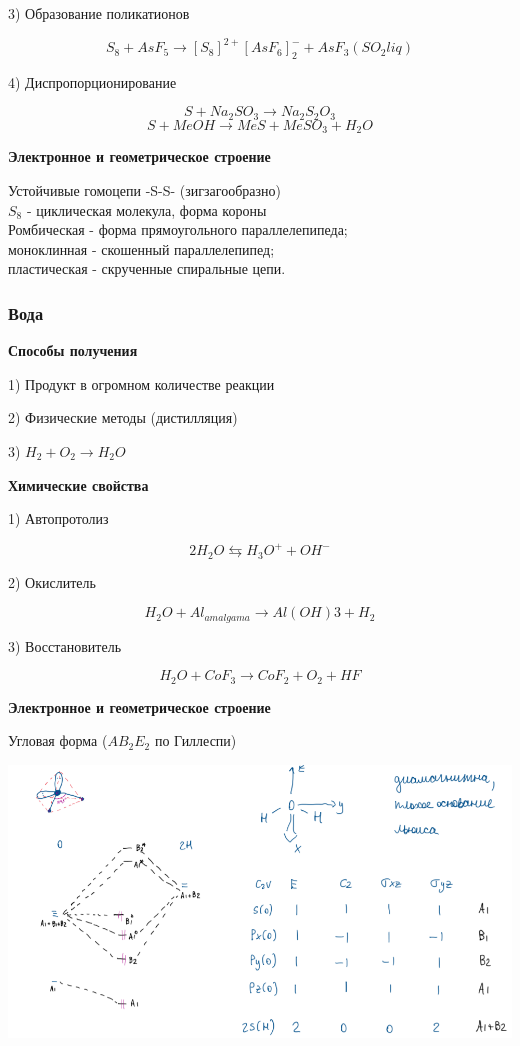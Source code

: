 \documentclass[14pt,a4paper]{scrartcl}
\begin{document}
3) Образование поликатионов

$$S_8 + AsF_5 \rightarrow [S_8]^{2+}[AsF_6]_2^- + AsF_3(SO_2 liq)$$

4) Диспропорционирование

$$S + Na_2SO_3 \rightarrow Na_2S_2O_3$$
$$S + MeOH \rightarrow MeS + MeSO_3 + H_2O$$

\textbf{Электронное и геометрическое строение}

Устойчивые гомоцепи -S-S- (зигзагообразно)\\
$S_8$ - циклическая молекула, форма короны\\
Ромбическая - форма прямоугольного параллелепипеда;\\
моноклинная - скошенный параллелепипед;\\
пластическая - скрученные спиральные цепи.

\subsubsection{Вода}

\textbf{Способы получения}


1) Продукт в огромном количестве реакции

2) Физические методы (дистилляция)

3) $H_2 + O_2 \rightarrow H_2O$

\textbf{Химические свойства}

1) Автопротолиз

$$2H_2O \leftrightarrows H_3O^+ + OH^-$$

2) Окислитель

$$H_2O + Al_{amalgama}\rightarrow Al(OH)3 + H_2$$

3) Восстановитель

$$H_2O + CoF_3 \rightarrow CoF_2 + O_2 + HF$$

\textbf{Электронное и геометрическое строение}

Угловая форма ($AB_2E_2$  по Гиллеспи)

\includegraphics{6v2.png}
\end{document}
